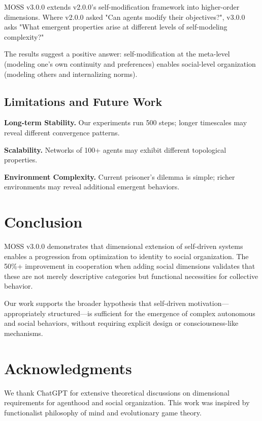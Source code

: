 \documentclass{article}
\begin{document}
MOSS v3.0.0 extends v2.0.0's self-modification framework into higher-order dimensions. Where v2.0.0 asked "Can agents modify their objectives?", v3.0.0 asks "What emergent properties arise at different levels of self-modeling complexity?"

The results suggest a positive answer: self-modification at the meta-level (modeling one's own continuity and preferences) enables social-level organization (modeling others and internalizing norms).

\subsection{Limitations and Future Work}

\textbf{Long-term Stability.} Our experiments run 500 steps; longer timescales may reveal different convergence patterns.

\textbf{Scalability.} Networks of 100+ agents may exhibit different topological properties.

\textbf{Environment Complexity.} Current prisoner's dilemma is simple; richer environments may reveal additional emergent behaviors.

\section{Conclusion}

MOSS v3.0.0 demonstrates that dimensional extension of self-driven systems enables a progression from optimization to identity to social organization. The 50\%+ improvement in cooperation when adding social dimensions validates that these are not merely descriptive categories but functional necessities for collective behavior.

Our work supports the broader hypothesis that self-driven motivation---appropriately structured---is sufficient for the emergence of complex autonomous and social behaviors, without requiring explicit design or consciousness-like mechanisms.

\section*{Acknowledgments}

We thank ChatGPT for extensive theoretical discussions on dimensional requirements for agenthood and social organization. This work was inspired by functionalist philosophy of mind and evolutionary game theory.



\end{document}

